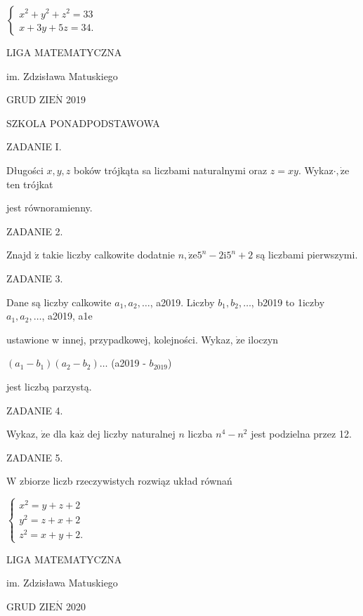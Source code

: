 \documentclass[a4paper,12pt]{article}
\begin{document}
$\left\{\begin{array}{l}
x^{2}+y^{2}+z^{2}=33\\
x+3y+5z=34.
\end{array}\right.$






LIGA MATEMATYCZNA

im. Zdzisława Matuskiego

GRUD Z$\mathrm{I}\mathrm{E}\acute{\mathrm{N}}$ 2019

SZKOLA PONADPODSTAWOWA

ZADANIE I.

Długości $x, y, z$ boków trójkąta sa liczbami naturalnymi oraz $z=xy$. Wykaz$\cdot, \dot{\mathrm{z}}\mathrm{e}$ ten trójkat

jest równoramienny.

ZADANIE 2.

Znajd $\acute{\mathrm{z}}$ takie liczby calkowite dodatnie $n, \dot{\mathrm{z}}\mathrm{e}5^{n}-2\mathrm{i}5^{n}+2$ są liczbami pierwszymi.

ZADANIE 3.

Dane są liczby calkowite $a_{1}, a_{2}, \ldots$, a2019. Liczby $b_{1}, b_{2}, \ldots$, b2019 to 1iczby $a_{1}, a_{2}, \ldots$, a2019, a1e

ustawione w innej, przypadkowej, kolejności. Wykaz, $\dot{\mathrm{z}}\mathrm{e}$ iloczyn

$(a_{1}-b_{1})(a_{2}-b_{2})\ldots$ (a2019 - $b_{2019}$)

jest liczbą parzystą.

ZADANIE 4.

Wykaz, $\dot{\mathrm{z}}\mathrm{e}$ dla $\mathrm{k}\mathrm{a}\dot{\mathrm{z}}$ dej liczby naturalnej $n$ liczba $n^{4}-n^{2}$ jest podzielna przez 12.

ZADANIE 5.

$\mathrm{W}$ zbiorze liczb rzeczywistych rozwiąz układ równań

$\left\{\begin{array}{l}
x^{2}=y+z+2\\
y^{2}=z+x+2\\
z^{2}=x+y+2.
\end{array}\right.$






LIGA MATEMATYCZNA

im. Zdzisława Matuskiego

GRUD Z$\mathrm{I}\mathrm{E}\acute{\mathrm{N}}$ 2020
\end{document}
